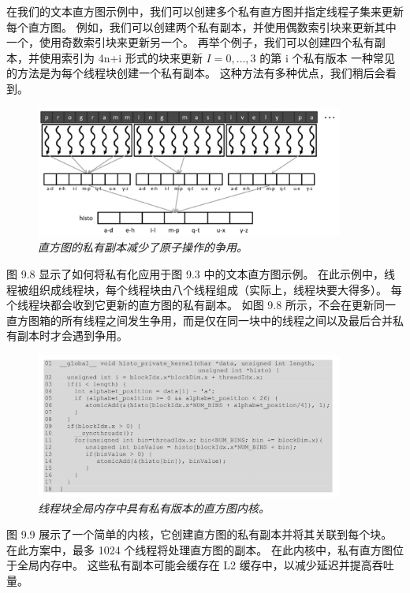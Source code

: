 在我们的文本直方图示例中，我们可以创建多个私有直方图并指定线程子集来更新每个直方图。 
例如，我们可以创建两个私有副本，并使用偶数索引块来更新其中一个，使用奇数索引块来更新另一个。 
再举个例子，我们可以创建四个私有副本，并使用索引为 4n+i 形式的块来更新 $I = 0,\ldots , 3$ 的第 i 个私有版本
一种常见的方法是为每个线程块创建一个私有副本。 这种方法有多种优点，我们稍后会看到。

\begin{figure}[H]
	\centering
	\includegraphics[width=0.9\textwidth]{figs/F9.8.png}
	\caption{\textit{直方图的私有副本减少了原子操作的争用。}}
\end{figure}

图 9.8 显示了如何将私有化应用于图 9.3 中的文本直方图示例。 
在此示例中，线程被组织成线程块，每个线程块由八个线程组成（实际上，线程块要大得多）。 
每个线程块都会收到它更新的直方图的私有副本。 
如图 9.8 所示，不会在更新同一直方图箱的所有线程之间发生争用，而是仅在同一块中的线程之间以及最后合并私有副本时才会遇到争用。

\begin{figure}[H]
	\centering
	\includegraphics[width=0.9\textwidth]{figs/F9.9.png}
	\caption{\textit{线程块全局内存中具有私有版本的直方图内核。}}
\end{figure}

图 9.9 展示了一个简单的内核，它创建直方图的私有副本并将其关联到每个块。 在此方案中，最多 1024 个线程将处理直方图的副本。 
在此内核中，私有直方图位于全局内存中。 这些私有副本可能会缓存在 L2 缓存中，以减少延迟并提高吞吐量。


